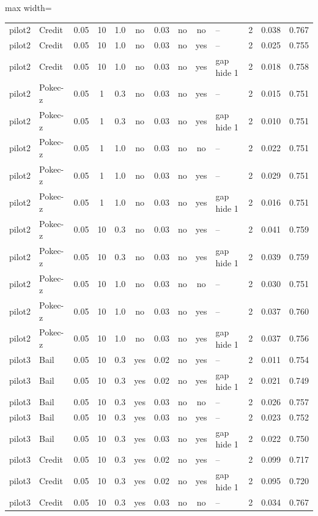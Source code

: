 \begin{table}[p]
\begin{adjustbox}{max width=\textwidth}
\begin{tabular}{llccccccclccc}
pilot2 & Credit & 0.05 & 10 & 1.0 & no & 0.03 & no & no & -- & 2 & 0.038 & 0.767 \\
pilot2 & Credit & 0.05 & 10 & 1.0 & no & 0.03 & no & yes & -- & 2 & 0.025 & 0.755 \\
pilot2 & Credit & 0.05 & 10 & 1.0 & no & 0.03 & no & yes & gap hide 1 & 2 & 0.018 & 0.758 \\
pilot2 & Pokec-z & 0.05 & 1 & 0.3 & no & 0.03 & no & yes & -- & 2 & 0.015 & 0.751 \\
pilot2 & Pokec-z & 0.05 & 1 & 0.3 & no & 0.03 & no & yes & gap hide 1 & 2 & 0.010 & 0.751 \\
pilot2 & Pokec-z & 0.05 & 1 & 1.0 & no & 0.03 & no & no & -- & 2 & 0.022 & 0.751 \\
pilot2 & Pokec-z & 0.05 & 1 & 1.0 & no & 0.03 & no & yes & -- & 2 & 0.029 & 0.751 \\
pilot2 & Pokec-z & 0.05 & 1 & 1.0 & no & 0.03 & no & yes & gap hide 1 & 2 & 0.016 & 0.751 \\
pilot2 & Pokec-z & 0.05 & 10 & 0.3 & no & 0.03 & no & yes & -- & 2 & 0.041 & 0.759 \\
pilot2 & Pokec-z & 0.05 & 10 & 0.3 & no & 0.03 & no & yes & gap hide 1 & 2 & 0.039 & 0.759 \\
pilot2 & Pokec-z & 0.05 & 10 & 1.0 & no & 0.03 & no & no & -- & 2 & 0.030 & 0.751 \\
pilot2 & Pokec-z & 0.05 & 10 & 1.0 & no & 0.03 & no & yes & -- & 2 & 0.037 & 0.760 \\
pilot2 & Pokec-z & 0.05 & 10 & 1.0 & no & 0.03 & no & yes & gap hide 1 & 2 & 0.037 & 0.756 \\
pilot3 & Bail & 0.05 & 10 & 0.3 & yes & 0.02 & no & yes & -- & 2 & 0.011 & 0.754 \\
pilot3 & Bail & 0.05 & 10 & 0.3 & yes & 0.02 & no & yes & gap hide 1 & 2 & 0.021 & 0.749 \\
pilot3 & Bail & 0.05 & 10 & 0.3 & yes & 0.03 & no & no & -- & 2 & 0.026 & 0.757 \\
pilot3 & Bail & 0.05 & 10 & 0.3 & yes & 0.03 & no & yes & -- & 2 & 0.023 & 0.752 \\
pilot3 & Bail & 0.05 & 10 & 0.3 & yes & 0.03 & no & yes & gap hide 1 & 2 & 0.022 & 0.750 \\
pilot3 & Credit & 0.05 & 10 & 0.3 & yes & 0.02 & no & yes & -- & 2 & 0.099 & 0.717 \\
pilot3 & Credit & 0.05 & 10 & 0.3 & yes & 0.02 & no & yes & gap hide 1 & 2 & 0.095 & 0.720 \\
pilot3 & Credit & 0.05 & 10 & 0.3 & yes & 0.03 & no & no & -- & 2 & 0.034 & 0.767 \\

\end{tabular}
\end{adjustbox}
\end{table}
